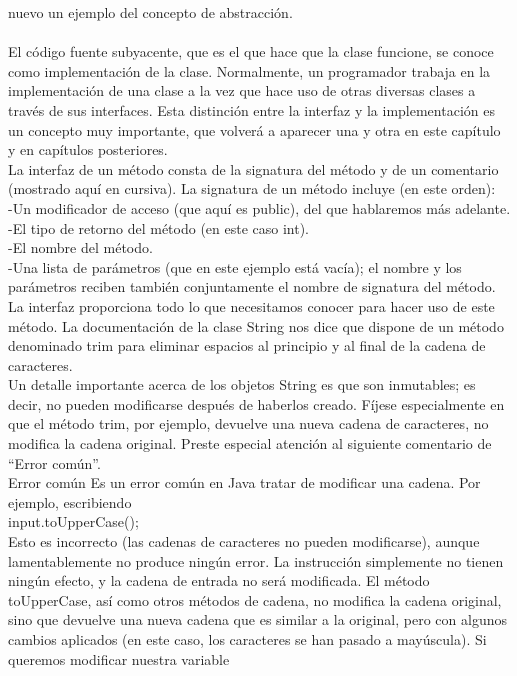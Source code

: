 \documentclass[11pt,a4paper]{article}
\begin{document}
	nuevo un ejemplo del concepto de abstracción.\\
	\\
	El código fuente subyacente, que es el que hace que la clase funcione, se conoce como implementación
	de la clase. Normalmente, un programador trabaja en la implementación de una clase a la
	vez que hace uso de otras diversas clases a través de sus interfaces.
	Esta distinción entre la interfaz y la implementación es un concepto muy importante, que volverá
	a aparecer una y otra en este capítulo y en capítulos posteriores.\\
	La interfaz de un método consta de la signatura del método y de un comentario (mostrado aquí en
	cursiva). La signatura de un método incluye (en este orden):\\
	-Un modificador de acceso (que aquí es public), del que hablaremos más adelante.\\
	-El tipo de retorno del método (en este caso int).\\
	-El nombre del método.\\
	-Una lista de parámetros (que en este ejemplo está vacía); el nombre y los parámetros reciben
	también conjuntamente el nombre de signatura del método.\\
	La interfaz proporciona todo lo que necesitamos conocer para hacer uso de este método. La documentación de la clase String nos dice que dispone de un método denominado trim para
	eliminar espacios al principio y al final de la cadena de caracteres.\\
	Un detalle importante acerca de los objetos String es que son inmutables; es decir, no pueden
	modificarse después de haberlos creado. Fíjese especialmente en que el método trim, por ejemplo,
	devuelve una nueva cadena de caracteres, no modifica la cadena original. Preste especial atención
	al siguiente comentario de “Error común”.\\
	Error común Es un error común en Java tratar de modificar una cadena. Por ejemplo, escribiendo\\
	input.toUpperCase();\\
	Esto es incorrecto (las cadenas de caracteres no pueden modificarse), aunque lamentablemente no
	produce ningún error. La instrucción simplemente no tienen ningún efecto, y la cadena de entrada no
	será modificada.
	El método toUpperCase, así como otros métodos de cadena, no modifica la cadena original, sino
	que devuelve una nueva cadena que es similar a la original, pero con algunos cambios aplicados
	(en este caso, los caracteres se han pasado a mayúscula). Si queremos modificar nuestra variable
\end{document}
